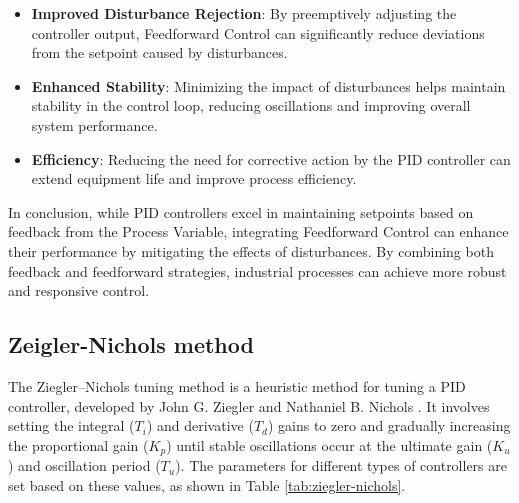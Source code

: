 \begin{itemize}
    \item \textbf{Improved Disturbance Rejection}: By preemptively adjusting the controller output, Feedforward Control can significantly reduce deviations from the setpoint caused by disturbances.

    \item \textbf{Enhanced Stability}: Minimizing the impact of disturbances helps maintain stability in the control loop, reducing oscillations and improving overall system performance.

    \item \textbf{Efficiency}: Reducing the need for corrective action by the PID controller can extend equipment life and improve process efficiency.
\end{itemize}

In conclusion, while PID controllers excel in maintaining setpoints based on
feedback from the Process Variable, integrating Feedforward Control can enhance
their performance by mitigating the effects of disturbances. By combining both
feedback and feedforward strategies, industrial processes can achieve more
robust and responsive control.

\subsection{Zeigler-Nichols method}
The Ziegler--Nichols tuning method is a heuristic method for tuning a PID
controller, developed by John G. Ziegler and Nathaniel B. Nichols
\cite{ziegler-nichols}. It involves setting the integral (\( T_i \)) and
derivative (\( T_d \)) gains to zero and gradually increasing the proportional
gain (\( K_p \)) until stable oscillations occur at the ultimate gain (\( K_u
\)) and oscillation period (\( T_u \)). The parameters for different types of
controllers are set based on these values, as shown in Table
\ref{tab:ziegler-nichols}.

